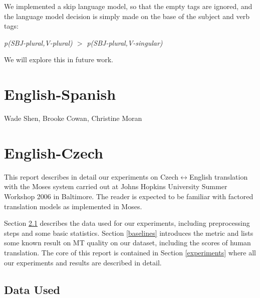 \documentclass[11pt]{report}
\theoremstyle{plain}
\begin{document}
{We implemented a skip language model, so that the empty tags are ignored, and the language model decision is simply made on the base of the subject and verb tags:
\begin{center}
{\em p(SBJ-plural,V-plural) $>$ p(SBJ-plural,V-singular)}
\end{center}

We will explore this in future work.

\section{English-Spanish}
{\sc Wade Shen, Brooke Cowan, Christine Moran}

\section{English-Czech}
{  %


\def\clap#1{\hbox to 0pt{\hss #1\hss}}
\def\equo#1{``#1''}
\def\ang#1{{$\langle${#1}$\rangle$}}  %
\def\text#1{{\it{}#1}}


\def\bidir{Czech$\leftrightarrow$English}
\def\tocs{English$\rightarrow$Czech}
\def\toen{Czech$\rightarrow$English}
\def\parcite#1{(\cite{#1})}
\def\perscite#1{\cite{#1}} %

\def\max#1{{\bf{} #1}}
\def\stddev#1{{$\pm$#1}}


\def\subsubsubsection#1{\bigskip{}{\it #1\\}}


This report describes in detail our experiments on \bidir{} translation
with the Moses system carried out at Johns Hopkins University
Summer Workshop 2006 in Baltimore. The reader is expected to be
familiar with factored translation models as implemented in Moses.

Section \ref{data} describes the data used for our experiments, including
preprocessing steps and some basic statistics. Section \ref{baselines}
introduces the metric and lists some known result on MT quality on our
dataset, including the scores of human translation. The core of this report is
contained in Section \ref{experiments} where all our experiments and results are
described in detail.




\subsection{Data Used}
\label{data}




}}
\end{document}
